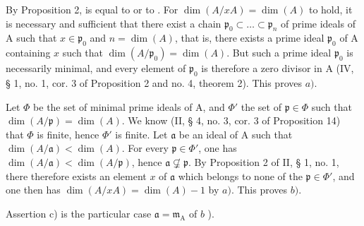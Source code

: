 By Proposition 2,  is equal to  or to . For \(\dim(A/xA) = \dim(A)\) to hold, it is necessary and sufficient that there exist a chain \(\mathfrak{p}_0 \subset \ldots \subset \mathfrak{p}_n\) of prime ideals of A such that \(x \in \mathfrak{p}_0\) and \(n = \dim(A)\), that is, there exists a prime ideal \(\mathfrak{p}_0\) of A containing \(x\) such that \(\dim(A/\mathfrak{p}_0) = \dim(A)\). But such a prime ideal \(\mathfrak{p}_0\) is necessarily minimal, and every element of \(\mathfrak{p}_0\) is therefore a zero divisor in A (IV, § 1, no. 1, cor. 3 of Proposition 2 and no. 4, theorem 2). This proves \(a)\).

Let \(\Phi\) be the set of minimal prime ideals of A, and \(\Phi'\) the set of \(\mathfrak{p} \in \Phi\) such that \(\dim(A/\mathfrak{p}) = \dim(A)\). We know (II, § 4, no. 3, cor. 3 of Proposition 14) that \(\Phi\) is finite, hence \(\Phi'\) is finite. Let \(\mathfrak{a}\) be an ideal of A such that \(\dim(A/\mathfrak{a}) < \dim(A)\). For every \(\mathfrak{p} \in \Phi'\), one has \(\dim(A/\mathfrak{a}) < \dim(A/\mathfrak{p})\), hence \(\mathfrak{a} \not\subsetneq \mathfrak{p}\). By Proposition 2 of II, § 1, no. 1, there therefore exists an element \(x\) of \(\mathfrak{a}\) which belongs to none of the \(\mathfrak{p} \in \Phi'\), and one then has \(\dim(A/xA) = \dim(A) - 1\) by \(a)\). This proves \(b)\).

Assertion c) is the particular case \(\mathfrak{a} = \mathfrak{m}_{\mathrm{A}}\) of \(b\) ).
\relax{}
